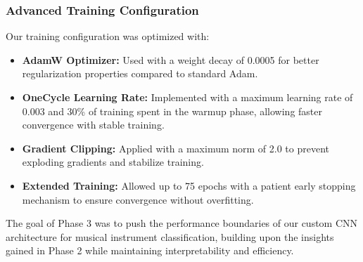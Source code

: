 \subsubsection{Advanced Training Configuration}
Our training configuration was optimized with:

\begin{itemize}
    \item \textbf{AdamW Optimizer:} Used with a weight decay of 0.0005 for better regularization properties compared to standard Adam.
    
    \item \textbf{OneCycle Learning Rate:} Implemented with a maximum learning rate of 0.003 and 30\% of training spent in the warmup phase, allowing faster convergence with stable training.
    
    \item \textbf{Gradient Clipping:} Applied with a maximum norm of 2.0 to prevent exploding gradients and stabilize training.
    
    \item \textbf{Extended Training:} Allowed up to 75 epochs with a patient early stopping mechanism to ensure convergence without overfitting.
\end{itemize}

The goal of Phase 3 was to push the performance boundaries of our custom CNN architecture for musical instrument classification, building upon the insights gained in Phase 2 while maintaining interpretability and efficiency.
